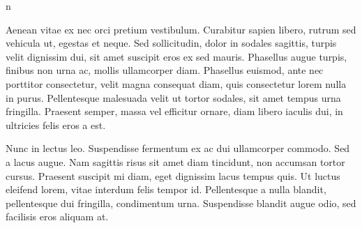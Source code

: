 n\documentclass{report}
\begin{document}
Aenean vitae ex nec orci pretium vestibulum. Curabitur sapien libero, rutrum sed vehicula ut, egestas et neque. Sed sollicitudin, dolor in sodales sagittis, turpis velit dignissim dui, sit amet suscipit eros ex sed mauris. Phasellus augue turpis, finibus non urna ac, mollis ullamcorper diam. Phasellus euismod, ante nec porttitor consectetur, velit magna consequat diam, quis consectetur lorem nulla in purus. Pellentesque malesuada velit ut tortor sodales, sit amet tempus urna fringilla. Praesent semper, massa vel efficitur ornare, diam libero iaculis dui, in ultricies felis eros a est.

Nunc in lectus leo. Suspendisse fermentum ex ac dui ullamcorper commodo. Sed a lacus augue. Nam sagittis risus sit amet diam tincidunt, non accumsan tortor cursus. Praesent suscipit mi diam, eget dignissim lacus tempus quis. Ut luctus eleifend lorem, vitae interdum felis tempor id. Pellentesque a nulla blandit, pellentesque dui fringilla, condimentum urna. Suspendisse blandit augue odio, sed facilisis eros aliquam at.
\end{document}
